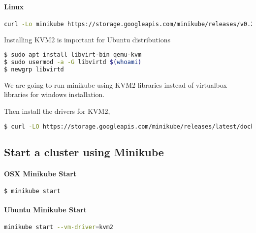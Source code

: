 \paragraph{Linux}\label{linux}

\begin{lstlisting}[language=bash]
curl -Lo minikube https://storage.googleapis.com/minikube/releases/v0.25.0/minikube-linux-amd64 && chmod +x minikube && sudo mv minikube /usr/local/bin/
\end{lstlisting}

Installing KVM2 is important for Ubuntu distributions

\begin{lstlisting}[language=bash]
$ sudo apt install libvirt-bin qemu-kvm
$ sudo usermod -a -G libvirtd $(whoami)
$ newgrp libvirtd
\end{lstlisting}

We are going to run minikube using KVM2 libraries instead of virtualbox
libraries for windows installation.

Then install the drivers for KVM2,

\begin{lstlisting}[language=bash]
$ curl -LO https://storage.googleapis.com/minikube/releases/latest/docker-machine-driver-kvm2 && chmod +x docker-machine-driver-kvm2 && sudo mv docker-machine-driver-kvm2 /usr/bin/
\end{lstlisting}

\subsection{Start a cluster using Minikube}

\paragraph{OSX Minikube Start}

\begin{lstlisting}[language=bash]
$ minikube start
\end{lstlisting}

\paragraph{Ubuntu Minikube Start}

\begin{lstlisting}[language=bash]
minikube start --vm-driver=kvm2
\end{lstlisting}

